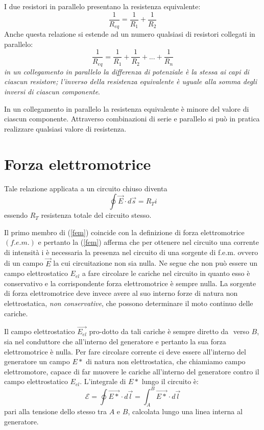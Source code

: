 \documentclass[class=book, crop=false, oneside, 12pt]{standalone}
\begin{document}
I due resistori in parallelo presentano la resistenza equivalente: 
\begin{equation*}
    \frac{1}{R_{eq}} = \frac{1}{R_1} + \frac{1}{R_2}
\end{equation*}
Anche questa relazione si estende ad un numero qualsiasi di resistori collegati in parallelo: 
\begin{equation}
    \frac{1}{R_{eq}} = \frac{1}{R_1} + \frac{1}{R_2} + ... + \frac{1}{R_n}
\end{equation}
\emph{in un collegamento in parallelo la differenza di potenziale è la stessa ai capi di ciascun resistore; l'inverso della resistenza equivalente è uguale alla somma degli inversi di ciascun componente}.

In un collegamento in parallelo la resistenza equivalente è minore del valore di ciascun componente.  
Attraverso combinazioni di serie e parallelo si può in pratica realizzare qualsiasi valore di resistenza.

\section{Forza elettromotrice}

Tale relazione applicata a un circuito chiuso diventa
\begin{equation} \label{fem}
    \oint \overrightarrow{E} \cdot d \overrightarrow{s} = R_T i 
\end{equation}
essendo \(R_T\) resistenza totale del circuito stesso.

Il primo membro di (\ref{fem}) coincide con la definizione di forza elettromotrice \((f.e.m.)\) e pertanto la (\ref{fem}) afferma che per ottenere nel circuito una corrente di intensità i è necessaria la presenza nel circuito di una sorgente di f.e.m. ovvero di un campo \(\overrightarrow{E}\) la cui circuitazione non sia nulla. 
Ne segue che non può essere un campo elettrostatico \(E_{el}\) a fare circolare le cariche nel circuito in quanto esso è conservativo e la corrispondente forza elettromotrice è sempre nulla. 
La sorgente di forza elettromotrice deve invece avere al suo interno forze di natura non elettrostatica, \emph{non conservative}, che possono determinare il moto continuo delle cariche. 

Il campo elettrostatico \(\overrightarrow{E_{el}}\) pro-dotto da tali cariche è sempre diretto da \(\) verso \(B\), sia nel conduttore che all'interno del generatore e pertanto la sua forza elettromotrice è nulla. 
Per fare circolare corrente ci deve essere all'interno del generatore un campo \( E*\) di natura non elettrostatica, che chiamiamo campo elettromotore, capace di far muovere le cariche all'interno del generatore contro il campo elettrostatico \(E_{el}\).
L'integrale di \(E*\) lungo il circuito è: 
\begin{equation}
    \mathcal{E} = \oint \overrightarrow{E*} \cdot d \overrightarrow{l} = \int_A^B \overrightarrow{E*} \cdot d \overrightarrow{l}
\end{equation}
pari alla tensione dello stesso tra \(A\) e \(B\), calcolata lungo una linea interna al generatore.
\end{document}
